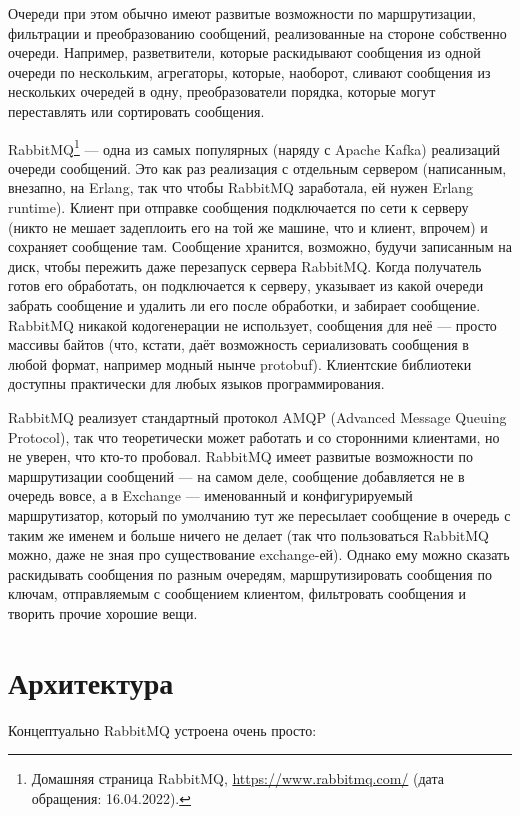 \documentclass[a5paper]{article}
\begin{document}
Очереди при этом обычно имеют развитые возможности по маршрутизации, фильтрации и преобразованию сообщений, реализованные на стороне собственно очереди. Например, разветвители, которые раскидывают сообщения из одной очереди по нескольким, агрегаторы, которые, наоборот, сливают сообщения из нескольких очередей в одну, преобразователи порядка, которые могут переставлять или сортировать сообщения.

RabbitMQ\footnote{Домашняя страница RabbitMQ, \url{https://www.rabbitmq.com/} (дата обращения: 16.04.2022).} --- одна из самых популярных (наряду с Apache Kafka) реализаций очереди сообщений. Это как раз реализация с отдельным сервером (написанным, внезапно, на Erlang, так что чтобы RabbitMQ заработала, ей нужен Erlang runtime). Клиент при отправке сообщения подключается по сети к серверу (никто не мешает задеплоить его на той же машине, что и клиент, впрочем) и сохраняет сообщение там. Сообщение хранится, возможно, будучи записанным на диск, чтобы пережить даже перезапуск сервера RabbitMQ. Когда получатель готов его обработать, он подключается к серверу, указывает из какой очереди забрать сообщение и удалить ли его после обработки, и забирает сообщение. RabbitMQ никакой кодогенерации не использует, сообщения для неё --- просто массивы байтов (что, кстати, даёт возможность сериализовать сообщения в любой формат, например модный нынче protobuf). Клиентские библиотеки доступны практически для любых языков программирования.

RabbitMQ реализует стандартный протокол AMQP (Advanced Message Queuing Protocol), так что теоретически может работать и со сторонними клиентами, но не уверен, что кто-то пробовал. RabbitMQ имеет развитые возможности по маршрутизации сообщений --- на самом деле, сообщение добавляется не в очередь вовсе, а в Exchange --- именованный и конфигурируемый маршрутизатор, который по умолчанию тут же пересылает сообщение в очередь с таким же именем и больше ничего не делает (так что пользоваться RabbitMQ можно, даже не зная про существование exchange-ей). Однако ему можно сказать раскидывать сообщения по разным очередям, маршрутизировать сообщения по ключам, отправляемым с сообщением клиентом, фильтровать сообщения и творить прочие хорошие вещи.

\section{Архитектура}

Концептуально RabbitMQ устроена очень просто:
\end{document}
